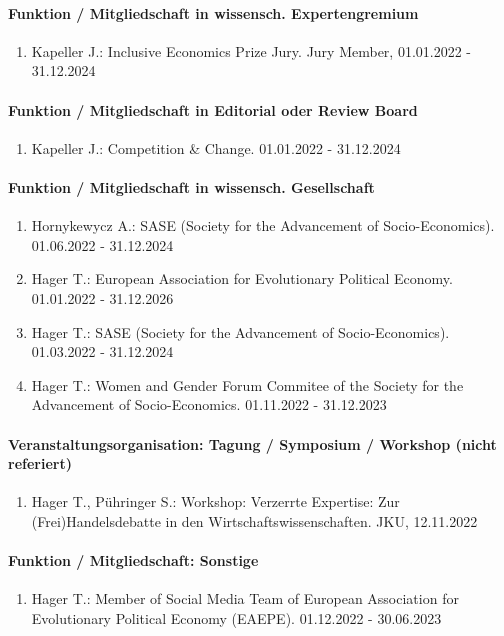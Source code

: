 \paragraph{Funktion / Mitgliedschaft in wissensch. Expertengremium}
\begin{enumerate}[leftmargin=*, labelsep=0.5cm]
\item Kapeller J.: Inclusive Economics Prize Jury. Jury Member, 01.01.2022 - 31.12.2024
\end{enumerate}
\paragraph{Funktion / Mitgliedschaft in Editorial oder Review Board}
\begin{enumerate}[leftmargin=*, labelsep=0.5cm]
\item Kapeller J.: Competition & Change. 01.01.2022 - 31.12.2024
\end{enumerate}
\paragraph{Funktion / Mitgliedschaft in wissensch. Gesellschaft}
\begin{enumerate}[leftmargin=*, labelsep=0.5cm]
\item Hornykewycz A.: SASE (Society for the Advancement of Socio-Economics). 01.06.2022 - 31.12.2024
\item Hager T.: European Association for Evolutionary Political Economy. 01.01.2022 - 31.12.2026
\item Hager T.: SASE (Society for the Advancement of Socio-Economics). 01.03.2022 - 31.12.2024
\item Hager T.: Women and Gender Forum Commitee of the Society for the Advancement of Socio-Economics. 01.11.2022 - 31.12.2023
\end{enumerate}
\paragraph{Veranstaltungsorganisation: Tagung / Symposium / Workshop (nicht referiert)}
\begin{enumerate}[leftmargin=*, labelsep=0.5cm]
\item Hager T., Pühringer S.: Workshop: Verzerrte Expertise: Zur (Frei)Handelsdebatte in den Wirtschaftswissenschaften. JKU, 12.11.2022
\end{enumerate}
\paragraph{Funktion / Mitgliedschaft: Sonstige}
\begin{enumerate}[leftmargin=*, labelsep=0.5cm]
\item Hager T.: Member of Social Media Team of European Association for Evolutionary Political Economy (EAEPE). 01.12.2022 - 30.06.2023
\end{enumerate}
